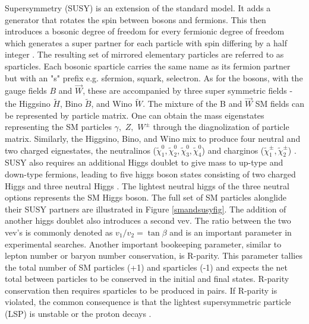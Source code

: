 Supersymmetry (SUSY) is an extension of the standard model. It adds a generator that rotates the spin between bosons and fermions. This then introduces a bosonic degree of freedom for every fermionic degree of freedom  which generates a super partner for each particle with spin differing by a half integer \cite{Baer:2007izw}.  The resulting set of mirrored elementary particles are referred to as sparticles. Each bosonic sparticle carries the same name as its fermion partner but with an "s" prefix e.g. sfermion, squark, selectron. As for the bosons, with the gauge fields $B$ and $\vec{W}$, these are accompanied by three super symmetric fields - the Higgsino $\tilde{H}$, Bino $\tilde{B}$, and Wino $\tilde{W}$. The mixture of the B and $\vec{W}$ SM fields can be represented by particle matrix. One can obtain the  mass eigenstates representing the SM particles $\gamma, \, \, Z, \, \, W^\pm$ through the diagnolization of particle matrix. Similarly, the Higgsino, Bino, and Wino mix to produce four neutral and two charged eignestates, the neutralinos ($\tilde{\chi}^0_1, \tilde{\chi}^0_2, \tilde{\chi}^0_3, \tilde{\chi}^0_4$)  and charginos ($\tilde{\chi}^\pm_1, \tilde{\chi}^\pm_2$) \cite{DJOUADI_2008}. SUSY also requires an additional Higgs doublet to give mass to up-type and down-type fermions,  leading to five higgs boson states consisting of two charged Higgs and three neutral Higgs \cite{Adam:2021rrw}. The lightest neutral higgs of the three neutral options represents the SM Higgs boson. The full set of SM particles alonglide their SUSY partners are illustrated in Figure \ref{smandsusyfig}. The addition of another higgs doublet also introduces a second vev. The ratio between the two vev's  is commonly denoted as $v_1/v_2 = \tan \beta$ and is an important parameter in experimental searches. Another important bookeeping parameter, similar to lepton number or baryon number conservation, is R-parity. This parameter tallies the total number of SM particles (+1) and sparticles (-1) and expects the net total between particles to be conserved in the initial and final states. R-parity conservation then requires sparticles to be produced in pairs. If R-parity is violated, the common consequence is that the lightest supersymmetric particle (LSP) is unstable or the proton decays \cite{Farrar:1978xj}. 




